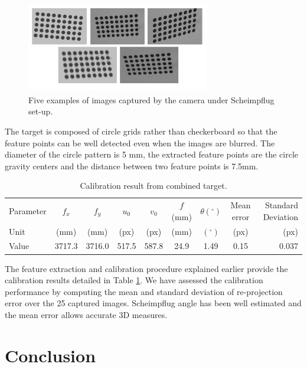 \documentclass[12pt]{article}
\begin{document}
\begin{figure}[htb]
	\centering
	\includegraphics[height=4cm, width=8cm]{figures/eximg.png}
	\caption {Five examples of images captured by the camera under Scheimpflug set-up.}

	\label{fig:datagrid}
\end{figure}



The target is composed of circle grids rather than checkerboard so that the feature points can be well detected even when the images are blurred. The diameter of the circle pattern is 5 mm, the extracted feature points are the circle gravity centers  and the distance between two feature points is 7.5mm. 


\begin{table}[h!]
  \begin{center}
\begin{tabular}{l*{7}{c}r}
\hline
Parameter             & $f_x $ & $f_y $&  $u_0 $ & $v_0$  & $f$(mm)& $\theta(^{\circ})$ & Mean error & Standard Deviation \\
		Unit					&	(mm)& (mm) &   (px) &  (px) & (mm)& $(^{\circ})$ & 						(px)	&	(px)\\
\hline
Value            & 3717.3& 3716.0 & 517.5&587.8&24.9 & 1.49 & 0.15 & 0.037  \\
\hline
\end{tabular}
  \end{center}
  \caption{Calibration result from combined target.}
\label{tab:resuty112}
\end{table}

The feature extraction and  calibration procedure explained earlier provide the calibration results detailed in Table  \ref{tab:resuty112}. We have assessed the calibration performance by computing the mean and standard deviation of re-projection error over the 25 captured images. Scheimpflug angle has been well estimated and the mean error allows accurate 3D measures.

\section{Conclusion}
\end{document}
